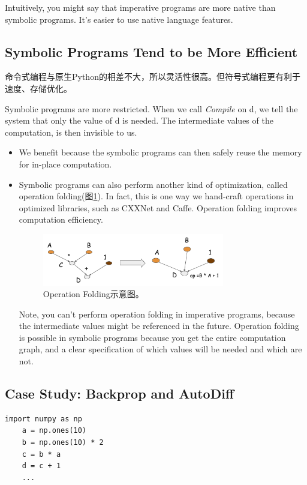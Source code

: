 Intuitively, you might say that imperative programs are more native than symbolic programs. It’s easier to use native language features. 

\subsection{Symbolic Programs Tend to be More Efficient}

命令式编程与原生Python的相差不大，所以灵活性很高。但符号式编程更有利于速度、存储优化。

Symbolic programs are more restricted. When we call \textit{Compile} on d, we tell the system that only the value of d is needed. The intermediate values of the computation, is then invisible to us.

\begin{itemize}
\item We benefit because the symbolic programs can then safely reuse the memory for in-place computation. 

\item Symbolic programs can also perform another kind of optimization, called operation folding(图\ref{Symbolic1}). In fact, this is one way we hand-craft operations in optimized libraries, such as CXXNet and Caffe. Operation folding improves computation efficiency.

\begin{figure}
\centering
\includegraphics[width=0.75\textwidth]{MXNet/Symbolic1.png}
\caption{Operation Folding示意图。}
\label{Symbolic1}
\end{figure}

Note, you can’t perform operation folding in imperative programs, because the intermediate values might be referenced in the future. Operation folding is possible in symbolic programs because you get the entire computation graph, and a clear specification of which values will be needed and which are not.
\end{itemize}

\subsection{Case Study: Backprop and AutoDiff}
\lstset{language=Python}
\begin{lstlisting}[title=toy model,frame=shadowbox]
import numpy as np
    a = np.ones(10)
    b = np.ones(10) * 2
    c = b * a
    d = c + 1
    ...
\end{lstlisting}


